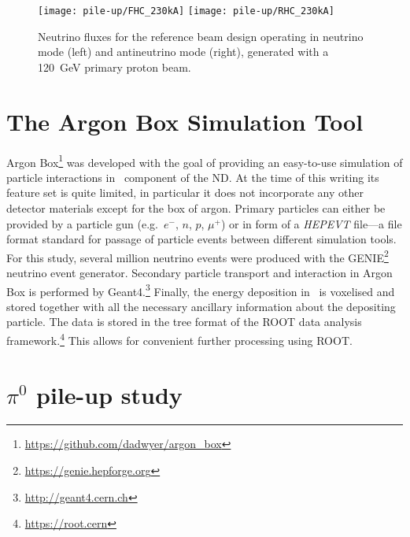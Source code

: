 \begin{figure}[htb]
	\centering
	\texttt{[image: pile-up/FHC\_230kA]}
	\texttt{[image: pile-up/RHC\_230kA]}
	\caption{Neutrino fluxes for the reference beam design operating in neutrino mode (left) and antineutrino mode (right), generated with a \SI{120}{\giga\electronvolt} primary proton beam.~\cite{dune2}}
	\label{fig:dune-nd_flux}
\end{figure}


\section{The Argon Box Simulation Tool}
\label{sec:dune-nd_argon-box}

Argon Box\footnote{\url{https://github.com/dadwyer/argon_box}} was developed with the goal of providing an easy-to-use simulation of particle interactions in \lar\ component of the ND.
At the time of this writing its feature set is quite limited, in particular it does not incorporate any other detector materials except for the box of argon.
Primary particles can either be provided by a particle gun (e.g.\ $e^-$, $n$, $p$, $\mu^+$) or in form of a \emph{HEPEVT} file---a file format standard for passage of particle events between different simulation tools.
For this study, several million neutrino events were produced with the GENIE\footnote{\url{https://genie.hepforge.org}} neutrino event generator.
Secondary particle transport and interaction in Argon Box is performed by Geant4.\footnote{\url{http://geant4.cern.ch}}
Finally, the energy deposition in \lar\ is voxelised and stored together with all the necessary ancillary information about the depositing particle.
The data is stored in the tree format of the ROOT data analysis framework.\footnote{\url{https://root.cern}}
This allows for convenient further processing using ROOT.


\section{$\pi^0$ pile-up study}
\label{sec:dune-nd_pile-up}

